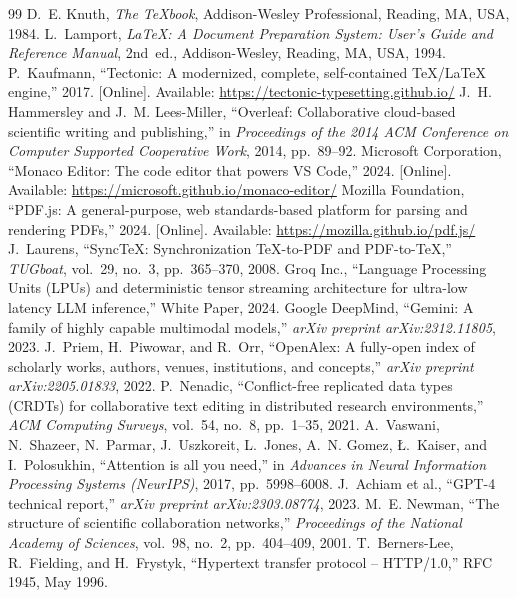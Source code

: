 \documentclass[12pt,a4paper]{article}
\begin{document}
\begingroup
\small
{}
\setlength{\itemsep}{5pt}
\setlength{\parskip}{0pt}
\begin{thebibliography}{99}
\setlength{\itemsep}{5pt}
 D.~E. Knuth, \emph{The \TeX{}book}, Addison-Wesley Professional, Reading, MA, USA, 1984.
 L.~Lamport, \emph{\LaTeX{}: A Document Preparation System: User's Guide and Reference Manual}, 2nd~ed., Addison-Wesley, Reading, MA, USA, 1994.
 P.~Kaufmann, ``Tectonic: A modernized, complete, self-contained \TeX{}/\LaTeX{} engine,'' 2017. [Online]. Available: \url{https://tectonic-typesetting.github.io/}
 J.~H. Hammersley and J.~M. Lees-Miller, ``Overleaf: Collaborative cloud-based scientific writing and publishing,'' in \emph{Proceedings of the 2014 ACM Conference on Computer Supported Cooperative Work}, 2014, pp.~89--92.
 Microsoft Corporation, ``Monaco Editor: The code editor that powers VS Code,'' 2024. [Online]. Available: \url{https://microsoft.github.io/monaco-editor/}
 Mozilla Foundation, ``PDF.js: A general-purpose, web standards-based platform for parsing and rendering PDFs,'' 2024. [Online]. Available: \url{https://mozilla.github.io/pdf.js/}
 J.~Laurens, ``Sync\TeX{}: Synchronization \TeX{}-to-PDF and PDF-to-\TeX{},'' \emph{TUGboat}, vol.~29, no.~3, pp.~365--370, 2008.
 Groq Inc., ``Language Processing Units (LPUs) and deterministic tensor streaming architecture for ultra-low latency LLM inference,'' White Paper, 2024.
 Google DeepMind, ``Gemini: A family of highly capable multimodal models,'' \emph{arXiv preprint arXiv:2312.11805}, 2023.
 J.~Priem, H.~Piwowar, and R.~Orr, ``OpenAlex: A fully-open index of scholarly works, authors, venues, institutions, and concepts,'' \emph{arXiv preprint arXiv:2205.01833}, 2022.
 P.~Nenadic, ``Conflict-free replicated data types (CRDTs) for collaborative text editing in distributed research environments,'' \emph{ACM Computing Surveys}, vol.~54, no.~8, pp.~1--35, 2021.
 A.~Vaswani, N.~Shazeer, N.~Parmar, J.~Uszkoreit, L.~Jones, A.~N. Gomez, {\L}.~Kaiser, and I.~Polosukhin, ``Attention is all you need,'' in \emph{Advances in Neural Information Processing Systems (NeurIPS)}, 2017, pp.~5998--6008.
 J.~Achiam et al., ``GPT-4 technical report,'' \emph{arXiv preprint arXiv:2303.08774}, 2023.
 M.~E. Newman, ``The structure of scientific collaboration networks,'' \emph{Proceedings of the National Academy of Sciences}, vol.~98, no.~2, pp.~404--409, 2001.
 T.~Berners-Lee, R.~Fielding, and H.~Frystyk, ``Hypertext transfer protocol -- HTTP/1.0,'' RFC 1945, May 1996.
\end{thebibliography}
\endgroup
\end{document}

